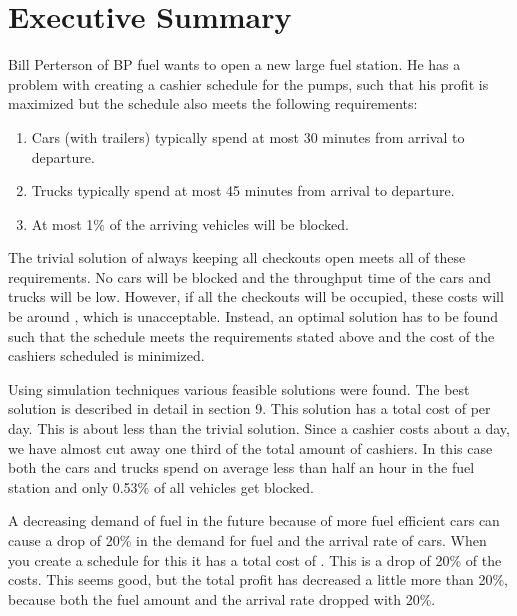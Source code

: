 \section{Executive Summary}
Bill Perterson of BP fuel wants to open a new large fuel station. He has a problem with creating a cashier schedule for the pumps, such that his profit is maximized but the schedule also meets the following requirements:
\begin{enumerate}
\item Cars (with  trailers) typically spend at most 30 minutes from arrival to departure.
\item Trucks typically spend at most 45 minutes from arrival to departure.
\item At most 1$\%$ of the arriving vehicles will be blocked.
\end{enumerate}

\noindent The trivial solution of always keeping all checkouts open meets all of these requirements. 
No cars will be blocked and the throughput time of the cars and trucks will be low.
However, if all the checkouts will be occupied, these costs will be around , which is unacceptable.
Instead, an optimal solution has to be found such that the schedule meets the requirements stated above and the cost of the cashiers scheduled is minimized.

\noindent Using simulation techniques various feasible solutions were found. The best solution is described in detail in section 9. 
This solution has a total cost of  per day. 
This is about  less than the trivial solution. 
Since a cashier costs about  a day, we have almost cut away one third of the total amount of cashiers. 
In this case both the cars and trucks spend on average less than half an hour in the fuel station and only 0.53\% of all vehicles get blocked.

\noindent A decreasing demand of fuel in the future because of more fuel efficient cars can cause a drop of 20\% in the demand for fuel and the arrival rate of cars. When you create a schedule for this it has a total cost of . This is a drop of 20\% of the costs. This seems good, but the total profit has decreased a little more than 20\%, because both the fuel amount and the arrival rate dropped with 20\%.